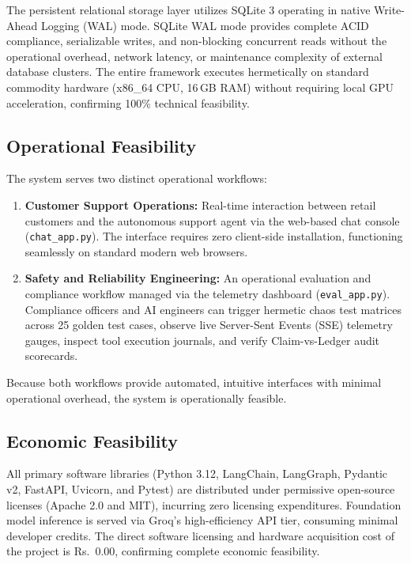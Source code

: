 The persistent relational storage layer utilizes SQLite 3 operating in native Write-Ahead Logging (WAL) mode. SQLite WAL mode provides complete ACID compliance, serializable writes, and non-blocking concurrent reads without the operational overhead, network latency, or maintenance complexity of external database clusters. The entire framework executes hermetically on standard commodity hardware (x86\_64 CPU, 16\,GB RAM) without requiring local GPU acceleration, confirming 100\% technical feasibility.

\subsection{Operational Feasibility}
The system serves two distinct operational workflows:
\begin{enumerate}
    \item \textbf{Customer Support Operations:} Real-time interaction between retail customers and the autonomous support agent via the web-based chat console (\texttt{chat\_app.py}). The interface requires zero client-side installation, functioning seamlessly on standard modern web browsers.
    \item \textbf{Safety and Reliability Engineering:} An operational evaluation and compliance workflow managed via the telemetry dashboard (\texttt{eval\_app.py}). Compliance officers and AI engineers can trigger hermetic chaos test matrices across 25 golden test cases, observe live Server-Sent Events (SSE) telemetry gauges, inspect tool execution journals, and verify Claim-vs-Ledger audit scorecards.
\end{enumerate}
Because both workflows provide automated, intuitive interfaces with minimal operational overhead, the system is operationally feasible.

\subsection{Economic Feasibility}
All primary software libraries (Python 3.12, LangChain, LangGraph, Pydantic v2, FastAPI, Uvicorn, and Pytest) are distributed under permissive open-source licenses (Apache 2.0 and MIT), incurring zero licensing expenditures. Foundation model inference is served via Groq's high-efficiency API tier, consuming minimal developer credits. The direct software licensing and hardware acquisition cost of the project is Rs.~0.00, confirming complete economic feasibility.

